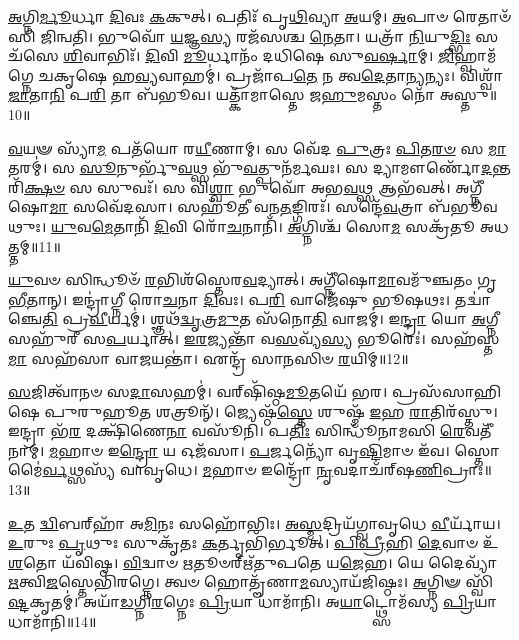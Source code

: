 \-\ul{𑌅}\-𑌗𑍍𑌨𑌿\-\ul{𑌰𑍍𑌮𑍂}\-𑌰𑍍𑌧𑌾 \ul{𑌦𑌿}\-𑌵𑌃 \ul{𑌕}\-𑌕𑍁𑌤𑍍।
𑌪𑌤𑌿𑌃᳴ 𑌪𑍃\-\ul{𑌥𑌿}\-𑌵𑍍𑌯𑌾 \ul{𑌅}\-𑌯𑌮𑍍।
\-\ul{𑌅}\-𑌪𑌾𑍞 𑌰𑍇𑌤𑌾𑍞᳴𑌸𑌿 𑌜𑌿𑌨𑍍𑌵𑌤𑌿।
𑌭𑍁𑌵𑍋᳴ \ul{𑌯}\-𑌜𑍍𑌞\-\ul{𑌸𑍍𑌯} 𑌰𑌜᳴𑌸𑌶𑍍𑌚 \ul{𑌨𑍇}\-𑌤𑌾।
𑌯𑌤𑍍𑌰𑌾᳴ \ul{𑌨𑌿}\-𑌯𑍁\-\ul{𑌦𑍍𑌭𑌿𑌃} 𑌸𑌚᳴𑌸𑍇 \ul{𑌶𑌿}\-𑌵𑌾𑌭𑌿𑌃᳴।
\-\ul{𑌦𑌿}\-𑌵𑌿 \ul{𑌮𑍂}\-𑌰𑍍𑌧𑌾𑌨𑌂᳴ 𑌦𑌧𑌿𑌷𑍇 𑌸𑍁\-\ul{𑌵}\-\-\ul{𑌰𑍍}\-𑌷𑌾𑌮𑍍।
\-\ul{𑌜𑌿}\-𑌹𑍍𑌵𑌾𑌮᳴𑌗𑍍𑌨𑍇 𑌚𑌕𑍃𑌷𑍇 𑌹\-\ul{𑌵𑍍𑌯}\-𑌵𑌾𑌹𑌮𑍍॑।
𑌪𑍍𑌰𑌜𑌾᳴𑌪\-\ul{𑌤𑍇} 𑌨 𑌤𑍍𑌵\-\ul{𑌦𑍇}\-𑌤𑌾\-\ul{𑌨𑍍𑌯}\-𑌨𑍍𑌯𑌃।
𑌵𑌿𑌶𑍍𑌵𑌾᳴ \ul{𑌜𑌾}\-𑌤𑌾\-\ul{𑌨𑌿} 𑌪\-\ul{𑌰𑌿} 𑌤𑌾 𑌬᳴𑌭𑍂𑌵।
𑌯𑌤𑍍𑌕𑌾᳴𑌮𑌾𑌸𑍍𑌤𑍇 𑌜\-\ul{𑌹𑍁}\-𑌮𑌸𑍍𑌤𑌂 𑌨𑍋᳴ 𑌅𑌸𑍍𑌤𑍁॥10॥

\-\ul{𑌵}\-𑌯𑍟 𑌸𑍍𑌯𑌾᳴\-\ul{𑌮} 𑌪𑌤᳴𑌯𑍋 𑌰\-\ul{𑌯𑍀}\-𑌣𑌾𑌮𑍍।
𑌸 𑌵𑍇᳴𑌦 \ul{𑌪𑍁}\-𑌤𑍍𑌰𑌃 \ul{𑌪𑌿}\-𑌤\-\ul{𑌰}\-\-\ul{𑍞} 𑌸 \ul{𑌮𑌾}\-𑌤𑌰𑌮𑍍॑।
𑌸 \ul{𑌸𑍂}\-𑌨𑍁𑌰𑍍𑌭𑍁᳴\-\ul{𑌵}\-𑌥𑍍𑌸 𑌭𑍁᳴\-\ul{𑌵}\-𑌤𑍍𑌪𑍁𑌨᳴𑌰𑍍𑌮𑌘𑌃।
𑌸 𑌦𑍍𑌯𑌾𑌮𑍗𑌰𑍍𑌣𑍋᳴\-\ul{𑌦}\-𑌨𑍍𑌤𑌰𑌿᳴\-\ul{𑌕𑍍𑌷}\-\-\ul{𑍞} 𑌸 𑌸𑍁𑌵𑌃᳴।
𑌸 𑌵𑌿\-\ul{𑌶𑍍𑌵𑌾} 𑌭𑍁𑌵𑍋᳴ 𑌅𑌭\-\ul{𑌵}\-𑌥𑍍𑌸 𑌆𑌭᳴𑌵𑌤𑍍।
𑌅𑌗𑍍𑌨𑍀᳴𑌷𑍋\-\ul{𑌮𑌾} 𑌸𑌵𑍇᳴𑌦𑌸𑌾।
𑌸𑌹𑍂᳴𑌤𑍀 𑌵𑌨\-\ul{𑌤}\-𑌙𑍍𑌗𑌿𑌰𑌃᳴।
𑌸𑌨𑍍𑌦𑍇᳴\-\ul{𑌵}\-𑌤𑍍𑌰𑌾 𑌬᳴𑌭𑍂𑌵𑌥𑍁𑌃।
\-\ul{𑌯𑍁}\-𑌵\-\ul{𑌮𑍇}\-𑌤𑌾𑌨𑌿᳴ \ul{𑌦𑌿}\-𑌵𑌿 𑌰𑍋᳴\-\ul{𑌚}\-𑌨𑌾𑌨𑌿᳴।
\-\ul{𑌅}\-𑌗𑍍𑌨𑌿𑌶𑍍𑌚᳴ 𑌸𑍋\-\ul{𑌮} 𑌸𑌕𑍍𑌰᳴𑌤𑍂 𑌅𑌧𑌤𑍍𑌤𑌮𑍍॥11॥

\-\ul{𑌯𑍁}\-𑌵𑍞 𑌸𑌿𑌨𑍍𑌧𑍂𑍞᳴ \ul{𑌰}\-𑌭𑌿𑌶᳴𑌸𑍍𑌤𑍇𑌰\-\ul{𑌵}\-𑌦𑍍𑌯𑌾𑌤𑍍।
𑌅𑌗𑍍𑌨𑍀᳴𑌷𑍋\-\ul{𑌮𑌾}\-𑌵𑌮𑍁᳴𑌞𑍍𑌚𑌤𑌂 𑌗𑍃\-\ul{𑌭𑍀}\-𑌤𑌾𑌨𑍍।
𑌇𑌨𑍍𑌦𑍍𑌰𑌾॑𑌗𑍍𑌨𑍀 𑌰𑍋\-\ul{𑌚}\-𑌨𑌾 \ul{𑌦𑌿}\-𑌵𑌃।
𑌪\-\ul{𑌰𑌿} 𑌵𑌾𑌜𑍇᳴𑌷𑍁 𑌭𑍂𑌷𑌥𑌃।
𑌤𑌦𑍍𑌵𑌾॑𑌞𑍍𑌚𑍇\-\ul{𑌤𑌿} 𑌪𑍍𑌰\-\ul{𑌵𑍀}\-𑌰𑍍𑌯𑌮𑍍॑।
𑌶𑍍𑌞𑌥᳴\-\ul{𑌦𑍍𑌵𑍃}\-𑌤𑍍𑌰\-\ul{𑌮𑍁}\-𑌤 𑌸᳴𑌨𑍋\-\ul{𑌤𑌿} 𑌵𑌾𑌜𑌮𑍍॑।
𑌇\-\ul{𑌨𑍍𑌦𑍍𑌰𑌾} 𑌯𑍋 \ul{𑌅}\-𑌗𑍍𑌨𑍀 𑌸𑌹𑍁᳴𑌰𑍀 𑌸\-\ul{𑌪}\-𑌰𑍍𑌯𑌾𑌤𑍍।
\-\ul{𑌇}\-\-\ul{𑌰}\-𑌜𑍍𑌯𑌨𑍍𑌤𑌾᳴ 𑌵\-\ul{𑌸}\-𑌵𑍍𑌯᳴\-\ul{𑌸𑍍𑌯} 𑌭𑍂𑌰𑍇𑌃॑।
𑌸𑌹᳴𑌸𑍍𑌤\-\ul{𑌮𑌾} 𑌸𑌹᳴𑌸𑌾 𑌵𑌾\-\ul{𑌜}\-𑌯𑌨𑍍𑌤𑌾॑।
𑌏𑌨𑍍𑌦𑍍𑌰᳴ 𑌸𑌾\-\ul{𑌨}\-𑌸𑌿𑍞 \ul{𑌰}\-𑌯𑌿𑌮𑍍॥12॥

\-\ul{𑌸}\-𑌜𑌿𑌤𑍍𑌵𑌾᳴𑌨𑍞 𑌸\-\ul{𑌦𑌾}\-𑌸𑌹𑌮𑍍॑।
𑌵𑌰𑍍‌\mbox{}𑌷𑌿᳴𑌷𑍍𑌠\-\ul{𑌮𑍂}\-𑌤𑌯𑍇᳴ 𑌭𑌰।
𑌪𑍍𑌰𑌸᳴𑌸𑌾𑌹𑌿𑌷𑍇 𑌪𑍁𑌰𑍁𑌹𑍂\-\ul{𑌤} 𑌶𑌤𑍍𑌰𑍂𑌨𑍍᳴।
𑌜𑍍𑌯𑍇𑌷𑍍𑌠᳴\-\ul{𑌸𑍍𑌤𑍇} 𑌶𑍁𑌷𑍍𑌮᳴ \ul{𑌇}\-𑌹 \ul{𑌰𑌾}\-𑌤𑌿𑌰᳴𑌸𑍍𑌤𑍁।
𑌇𑌨𑍍𑌦𑍍𑌰𑌾 𑌭᳴\-\ul{𑌰} 𑌦𑌕𑍍𑌷𑌿᳴𑌣𑍇\-\ul{𑌨𑌾} 𑌵𑌸𑍂᳴𑌨𑌿।
𑌪\-\ul{𑌤𑌿𑌃} 𑌸𑌿𑌨𑍍𑌧𑍂᳴𑌨𑌾𑌮𑌸𑌿 \ul{𑌰𑍇}\-𑌵𑌤𑍀᳴𑌨𑌾𑌮𑍍।
\-\ul{𑌮}\-𑌹𑌾𑍞 𑌇\-\ul{𑌨𑍍𑌦𑍍𑌰𑍋} 𑌯 𑌓𑌜᳴𑌸𑌾।
\-\ul{𑌪}\-𑌰𑍍𑌜𑌨𑍍𑌯𑍋᳴ 𑌵𑍃\-\ul{𑌷𑍍𑌟𑌿}\-𑌮𑌾𑍞 𑌇᳴𑌵।
𑌸𑍍𑌤𑍋𑌮𑍈॑\-\ul{𑌰𑍍𑌵}\-𑌥𑍍𑌸𑌸𑍍𑌯᳴ 𑌵𑌾𑌵𑍃𑌧𑍇।
\-\ul{𑌮}\-𑌹𑌾𑍞 𑌇𑌨𑍍𑌦𑍍𑌰𑍋᳴ \ul{𑌨𑍃}\-𑌵𑌦𑌾𑌚᳴𑌰𑍍‌\mbox{}𑌷\-\ul{𑌣𑌿}\-𑌪𑍍𑌰𑌾𑌃॥13॥

\-\ul{𑌉}\-𑌤 \ul{𑌦𑍍𑌵𑌿}\-𑌬𑌰𑍍‌\mbox{}𑌹𑌾᳴ 𑌅\-\ul{𑌮𑌿}\-𑌨𑌃 𑌸𑌹𑍋᳴𑌭𑌿𑌃।
\-\ul{𑌅}\-\-\ul{𑌸𑍍𑌮}\-𑌦𑍍𑌰𑌿𑌯᳴𑌗𑍍𑌵𑌾𑌵𑍃𑌧𑍇 \ul{𑌵𑍀}\-𑌰𑍍𑌯𑌾᳴𑌯।
\-\ul{𑌉}\-𑌰𑍁𑌃 \ul{𑌪𑍃}\-𑌥𑍁𑌃 𑌸𑍁𑌕𑍃᳴𑌤𑌃 \ul{𑌕}\-𑌰𑍍𑌤𑍃𑌭𑌿᳴𑌰𑍍𑌭𑍂𑌤𑍍।
\-\ul{𑌪𑌿}\-\-\ul{𑌪𑍍𑌰𑍀}\-𑌹𑌿 \ul{𑌦𑍇}\-𑌵𑌾𑍞 𑌉᳴\-\ul{𑌶}\-𑌤𑍋 𑌯᳴𑌵𑌿𑌷𑍍𑌠।
\-\ul{𑌵𑌿}\-𑌦𑍍𑌵𑌾𑍞 \ul{𑌋}\-𑌤𑍂𑍞𑌰𑍍\mbox{}𑌋᳴𑌤𑍁𑌪𑌤𑍇 𑌯\-\ul{𑌜𑍇}\-𑌹।
𑌯𑍇 𑌦𑍈𑌵𑍍𑌯𑌾᳴ \ul{𑌋}\-𑌤𑍍𑌵𑌿\-\ul{𑌜}\-𑌸𑍍𑌤𑍇𑌭𑌿᳴𑌰𑌗𑍍𑌨𑍇।
𑌤𑍍𑌵𑍞 𑌹𑍋𑌤𑍄᳴𑌣𑌾\-\ul{𑌮}\-𑌸𑍍𑌯𑌾𑌯᳴𑌜𑌿𑌷𑍍𑌠𑌃।
\-\ul{𑌅}\-𑌗𑍍𑌨𑌿𑍟 𑌸𑍍𑌵𑌿᳴\-\ul{𑌷𑍍𑌟}\-𑌕𑍃𑌤𑌮𑍍॑।
𑌅𑌯𑌾᳴\-\ul{𑌡}\-𑌗𑍍𑌨𑌿\-\ul{𑌰}\-𑌗𑍍𑌨𑍇𑌃 \ul{𑌪𑍍𑌰𑌿}\-𑌯𑌾 𑌧𑌾𑌮𑌾᳴𑌨𑌿।
𑌅\-\ul{𑌯𑌾}\-𑌟𑍍𑌥𑍍𑌸𑍋𑌮᳴𑌸𑍍𑌯 \ul{𑌪𑍍𑌰𑌿}\-𑌯𑌾 𑌧𑌾𑌮𑌾᳴𑌨𑌿॥14॥

